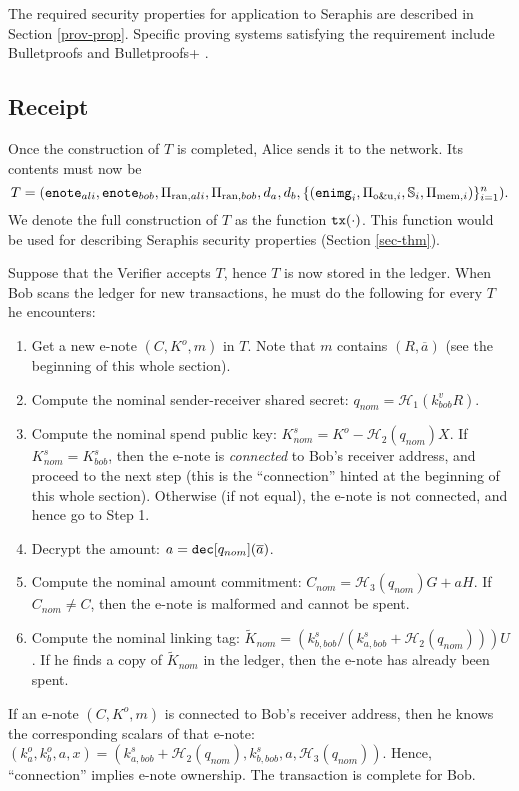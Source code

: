 \documentclass{article}
\begin{document}
The required security properties for application to Seraphis are described in Section \ref{prov-prop}. Specific proving systems satisfying the requirement include Bulletproofs \cite{bp} and Bulletproofs+ \cite{bp-plus}.

\subsection{Receipt}
Once the construction of $T$ is completed, Alice sends it to the network. Its contents must now be
$$T=({\tt enote}_{ali}, {\tt enote}_{bob}, \Pi_{\text{ran}, ali}, \Pi_{\text{ran}, bob}, d_a, d_b, \{({\tt enimg}_i, \Pi_{\text{o\&u}, i}, \mathbb{S}_i, \Pi_{\text{mem}, i})\}_{i=1}^n).$$
We denote the full construction of $T$ as the function ${\tt tx}(\cdot)$. This function would be used for describing Seraphis security properties (Section \ref{sec-thm}).

Suppose that the Verifier accepts $T$, hence $T$ is now stored in the ledger. When Bob scans the ledger for new transactions, he must do the following for every $T$ he encounters:
\begin{enumerate}
    \item Get a new e-note $(C, K^o, m)$ in $T$. Note that $m$ contains $(R, \overline{a})$ (see the beginning of this whole section).
    \item Compute the nominal sender-receiver shared secret: $q_{nom} = \mathcal{H}_1(k_{bob}^v R)$.
    \item Compute the nominal spend public key: $K_{nom}^s = K^o - \mathcal{H}_2(q_{nom})X$. If $K_{nom}^s = K_{bob}^s$, then the e-note is \textit{connected} to Bob's receiver address, and proceed to the next step (this is the ``connection'' hinted at the beginning of this whole section).  Otherwise (if not equal), the e-note is not connected, and hence go to Step 1.
    \item Decrypt the amount: $a = {\tt dec}[q_{nom}](\overline a)$.
    \item Compute the nominal amount commitment: $C_{nom} = \mathcal{H}_3(q_{nom})G + a H$. If $C_{nom} \ne C$, then the e-note is malformed and cannot be spent.
    \item Compute the nominal linking tag: $\tilde{K}_{nom} = (k_{b, bob}^s/(k_{a, bob}^s + \mathcal{H}_2(q_{nom})))U$. If he finds a copy of $\tilde{K}_{nom}$ in the ledger, then the e-note has already been spent.
\end{enumerate}
If an e-note $(C, K^o, m)$ is connected to Bob's receiver address, then he knows the corresponding scalars of that e-note: $(k_a^o, k_b^o, a, x) = (k_{a, bob}^s + \mathcal{H}_2(q_{nom}), k_{b, bob}^s, a, \mathcal{H}_3(q_{nom}))$. Hence, ``connection'' implies e-note ownership. The transaction is complete for Bob.
\end{document}
